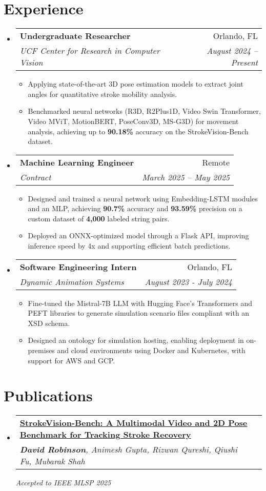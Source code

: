 \documentclass[letterpaper,11pt]{article}
\makeatletter
\newcommand{\resumeItem}[1]{
  \item\small{
    {#1 \vspace{-2pt}}
  }
}
\newcommand{\resumeSubheading}[4]{
  \vspace{-2pt}\item
    \begin{tabular*}{0.97\textwidth}[t]{l@{\extracolsep{\fill}}r}
      \textbf{#1} & #2 \\
      \textit{\small#3} & \textit{\small #4} \\
    \end{tabular*}\vspace{-7pt}
}
\newcommand{\resumeSubHeadingListStart}{\begin{itemize}[leftmargin=0.15in, label={}]}
\newcommand{\resumeSubHeadingListEnd}{\end{itemize}}
\newcommand{\resumeItemListStart}{\begin{itemize}}
\newcommand{\resumeItemListEnd}{\end{itemize}\vspace{-5pt}}
\makeatother
\begin{document}
\section{Experience}
  \resumeSubHeadingListStart
  \resumeSubheading
    {Undergraduate Researcher}{Orlando, FL}
    {UCF Center for Research in Computer Vision}{August 2024 -- Present}
    \resumeItemListStart
      \resumeItem{Applying state-of-the-art 3D pose estimation models to extract joint angles for quantitative stroke mobility analysis.}
      \resumeItem{Benchmarked neural networks (R3D, R2Plus1D, Video Swin Transformer, Video MViT, MotionBERT, PoseConv3D, MS-G3D) for movement analysis, achieving up to \textbf{90.18\%} accuracy on the StrokeVision-Bench dataset.}
    \resumeItemListEnd
    \resumeSubheading
      {Machine Learning Engineer}{Remote}
      {Contract}{March 2025 -- May 2025}
      \resumeItemListStart
        \resumeItem{Designed and trained a neural network using Embedding-LSTM modules and an MLP, achieving \textbf{90.7\%} accuracy and \textbf{93.59\%} precision on a custom dataset of \textbf{4,000} labeled string pairs.}
        \resumeItem{Deployed an ONNX-optimized model through a Flask API, improving inference speed by 4x and supporting efficient batch predictions.}
      \resumeItemListEnd
    \resumeSubheading
      {Software Engineering Intern}{Orlando, FL}
      {Dynamic Animation Systems}{August 2023 - July 2024}
      \resumeItemListStart
        \resumeItem{Fine-tuned the Mistral-7B LLM with Hugging Face's Transformers and PEFT libraries to generate simulation scenario files compliant with an XSD schema.}
        \resumeItem{Designed an ontology for simulation hosting, enabling deployment in on-premises and cloud environments using Docker and Kubernetes, with support for AWS and GCP.}
      \resumeItemListEnd
  \resumeSubHeadingListEnd
  
  \section{Publications}
  \resumeSubHeadingListStart
    \resumeSubheading
      {\href{https://arxiv.org/abs/2509.07994}{\textbf{\uline{StrokeVision-Bench: A Multimodal Video and 2D Pose Benchmark for Tracking Stroke Recovery}}}}{} 
      {\textbf{David Robinson}, Animesh Gupta, Rizwan Qureshi, Qiushi Fu, Mubarak Shah}{}
      \vspace{0em}

      \textit{Accepted to IEEE MLSP 2025}
  \resumeSubHeadingListEnd
\end{document}

